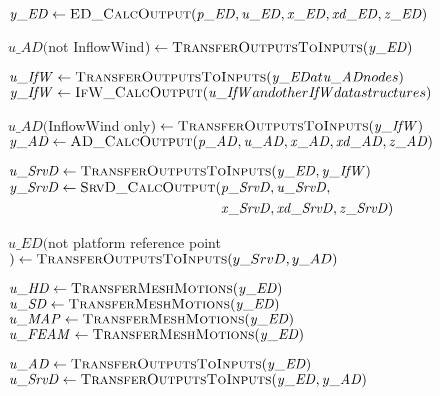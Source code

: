 \documentclass[10pt,letterpaper,oneside,notitlepage]{article}
\begin{document}
\begin{algorithmic}[1]
\State $\mathit{y\_ED} \gets \Call{ED\_CalcOutput}{\mathit{p\_ED},\mathit{u\_ED},\mathit{x\_ED},\mathit{xd\_ED},\mathit{z\_ED}}$

\State
	\State $\mathit{u\_AD}($not InflowWind$)  \gets \Call{TransferOutputsToInputs}{\mathit{y\_ED}}$
	
	\State $\mathit{u\_IfW} \gets \Call{TransferOutputsToInputs}{\mathit{y\_ED} at \mathit{u\_AD} nodes}$
	\State $\mathit{y\_IfW} \gets \Call{IfW\_CalcOutput}{\mathit{u\_IfW} and other \mathit{IfW} data structures}$
	
	\State $\mathit{u\_AD}($InflowWind only$) \gets \Call{TransferOutputsToInputs}{\mathit{y\_IfW}}$
	\State $\mathit{y\_AD} \gets \Call{AD\_CalcOutput}{\mathit{p\_AD},\mathit{u\_AD},\mathit{x\_AD},\mathit{xd\_AD},\mathit{z\_AD}}$

\State
	\State $\mathit{u\_SrvD} \gets \Call{TransferOutputsToInputs}{\mathit{y\_ED},\mathit{y\_IfW}}$
	\State $\mathit{y\_SrvD} \gets \Call{SrvD\_CalcOutput}{}( \!
				\begin{aligned}[t]
				                      & \mathit{p\_SrvD},\mathit{u\_SrvD}, \\
	                            & \mathit{x\_SrvD},\mathit{xd\_SrvD},\mathit{z\_SrvD}) \\
				\end{aligned}$

\State
	\State $\mathit{u\_ED}($not platform reference point$) \gets \Call{TransferOutputsToInputs}{y\_SrvD,y\_AD}$ %

	\State $\mathit{u\_HD}   \gets \Call{TransferMeshMotions}{\mathit{y\_ED}}$
	\State $\mathit{u\_SD}   \gets \Call{TransferMeshMotions}{\mathit{y\_ED}}$
	\State $\mathit{u\_MAP}  \gets \Call{TransferMeshMotions}{\mathit{y\_ED}}$
	\State $\mathit{u\_FEAM} \gets \Call{TransferMeshMotions}{\mathit{y\_ED}}$

\State
\State {}
\State
\State $\mathit{u\_AD} \gets \Call{TransferOutputsToInputs}{\mathit{y\_ED}}$
\State $\mathit{u\_SrvD} \gets \Call{TransferOutputsToInputs}{\mathit{y\_ED},\mathit{y\_AD}}$

\EndProcedure
\end{algorithmic}
\end{document}
